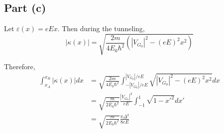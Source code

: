 \documentclass{article}
\begin{document}
\subsection{Part (c)}
%
%
%
%
%
Let $\varepsilon(x)=eEx$. Then during the tunneling,
\begin{equation*}
|\kappa(x)|=\sqrt{\frac{2m}{4E_0\hbar^2}\left(|V_{G_0}|^2-(eE)^2x^2\right)}
\end{equation*}

Therefore,
\begin{align*}
\int_{x_A}^{x_B}|\kappa(x)|dx&=\sqrt{\frac{2m}{4E_0\hbar^2}}\int_{-|V_{G_0}|/eE}^{|V_{G_0}|/eE}\sqrt{|V_{G_0}|^2-(eE)^2x^2}dx\\
&=\sqrt{\frac{m}{2E_0\hbar^2}}\frac{|V_{G_0}|^2}{eE}\int_{-1}^1\sqrt{1-x'^2}dx'\\
&=\sqrt{\frac{m}{2E_0\hbar^2}}\frac{\pi\Delta^2}{8eE}
\end{align*}
\end{document}
